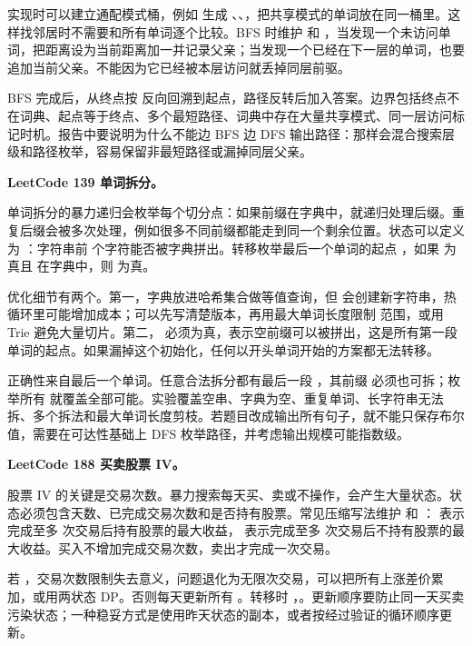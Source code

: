 实现时可以建立通配模式桶，例如  生成 、、，把共享模式的单词放在同一桶里。这样找邻居时不需要和所有单词逐个比较。BFS 时维护  和 ，当发现一个未访问单词，把距离设为当前距离加一并记录父亲；当发现一个已经在下一层的单词，也要追加当前父亲。不能因为它已经被本层访问就丢掉同层前驱。

BFS 完成后，从终点按  反向回溯到起点，路径反转后加入答案。边界包括终点不在词典、起点等于终点、多个最短路径、词典中存在大量共享模式、同一层访问标记时机。报告中要说明为什么不能边 BFS 边 DFS 输出路径：那样会混合搜索层级和路径枚举，容易保留非最短路径或漏掉同层父亲。

\noindent\textbf{LeetCode 139 单词拆分。}

单词拆分的暴力递归会枚举每个切分点：如果前缀在字典中，就递归处理后缀。重复后缀会被多次处理，例如很多不同前缀都能走到同一个剩余位置。状态可以定义为 ：字符串前  个字符能否被字典拼出。转移枚举最后一个单词的起点 ，如果  为真且  在字典中，则  为真。

优化细节有两个。第一，字典放进哈希集合做等值查询，但  会创建新字符串，热循环里可能增加成本；可以先写清楚版本，再用最大单词长度限制  范围，或用 Trie 避免大量切片。第二， 必须为真，表示空前缀可以被拼出，这是所有第一段单词的起点。如果漏掉这个初始化，任何以开头单词开始的方案都无法转移。

正确性来自最后一个单词。任意合法拆分都有最后一段 ，其前缀  必须也可拆；枚举所有  就覆盖全部可能。实验覆盖空串、字典为空、重复单词、长字符串无法拆、多个拆法和最大单词长度剪枝。若题目改成输出所有句子，就不能只保存布尔值，需要在可达性基础上 DFS 枚举路径，并考虑输出规模可能指数级。

\noindent\textbf{LeetCode 188 买卖股票 IV。}

股票 IV 的关键是交易次数。暴力搜索每天买、卖或不操作，会产生大量状态。状态必须包含天数、已完成交易次数和是否持有股票。常见压缩写法维护  和 ： 表示完成至多  次交易后持有股票的最大收益， 表示完成至多  次交易后不持有股票的最大收益。买入不增加完成交易次数，卖出才完成一次交易。

若 ，交易次数限制失去意义，问题退化为无限次交易，可以把所有上涨差价累加，或用两状态 DP。否则每天更新所有 。转移时 ，。更新顺序要防止同一天买卖污染状态；一种稳妥方式是使用昨天状态的副本，或者按经过验证的循环顺序更新。

